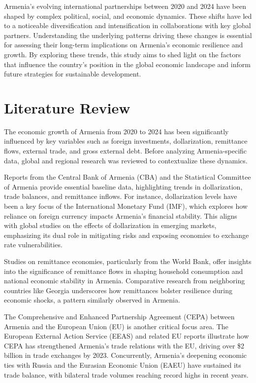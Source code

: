 \documentclass[
]{article}
\begin{document}
Armenia's evolving international partnerships between 2020 and 2024 have
been shaped by complex political, social, and economic dynamics. These
shifts have led to a noticeable diversification and intensification in
collaborations with key global partners. Understanding the underlying
patterns driving these changes is essential for assessing their
long-term implications on Armenia's economic resilience and growth. By
exploring these trends, this study aims to shed light on the factors
that influence the country's position in the global economic landscape
and inform future strategies for sustainable development.

\section{Literature Review}\label{literature-review}

The economic growth of Armenia from 2020 to 2024 has been significantly
influenced by key variables such as foreign investments, dollarization,
remittance flows, external trade, and gross external debt. Before
analyzing Armenia-specific data, global and regional research was
reviewed to contextualize these dynamics.

Reports from the Central Bank of Armenia (CBA) and the Statistical
Committee of Armenia provide essential baseline data, highlighting
trends in dollarization, trade balances, and remittance inflows. For
instance, dollarization levels have been a key focus of the
International Monetary Fund (IMF), which explores how reliance on
foreign currency impacts Armenia's financial stability. This aligns with
global studies on the effects of dollarization in emerging markets,
emphasizing its dual role in mitigating risks and exposing economies to
exchange rate vulnerabilities.

Studies on remittance economies, particularly from the World Bank, offer
insights into the significance of remittance flows in shaping household
consumption and national economic stability in Armenia. Comparative
research from neighboring countries like Georgia underscores how
remittances bolster resilience during economic shocks, a pattern
similarly observed in Armenia.

The Comprehensive and Enhanced Partnership Agreement (CEPA) between
Armenia and the European Union (EU) is another critical focus area. The
European External Action Service (EEAS) and related EU reports
illustrate how CEPA has strengthened Armenia's trade relations with the
EU, driving over \$2 billion in trade exchanges by 2023. Concurrently,
Armenia's deepening economic ties with Russia and the Eurasian Economic
Union (EAEU) have sustained its trade balance, with bilateral trade
volumes reaching record highs in recent years.
\end{document}
